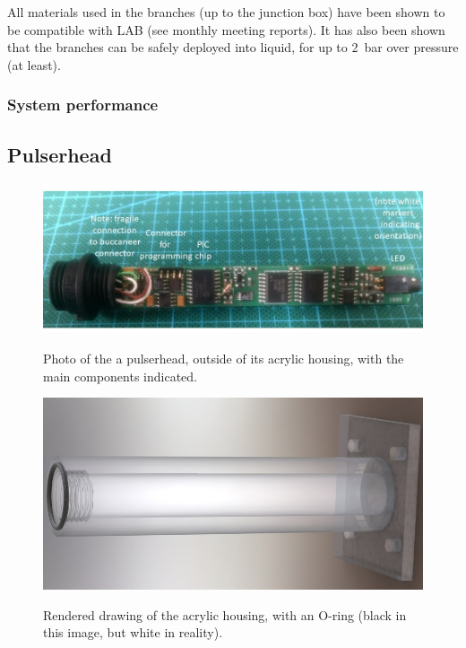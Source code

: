 All materials used in the branches (up to the junction box) have been shown to be compatible with LAB (see monthly meeting reports). 
It has also been shown that the branches can be safely deployed into liquid, for up to 2~bar over pressure (at least).


%
%

\subsubsection*{System performance}


\subsection*{Pulserhead}

\begin{figure}
\begin{center}	
  \includegraphics[width=1.0\linewidth]{figures/pulserhead.jpg}
  \caption{Photo of the a pulserhead, outside of its acrylic housing, with the main components indicated.}
  \label{figure:pulserhead}
  \includegraphics[width=0.75\linewidth]{figures/PulserTube2.jpg}
  \caption{Rendered drawing of the acrylic housing, with an O-ring (black in this image, but white in reality).}
  \label{figure:pulserhead_housing}
\end{center}
\end{figure}


